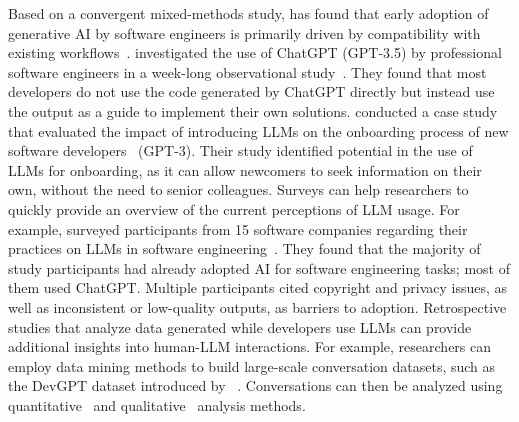 Based on a convergent mixed-methods study, \citeauthor{russo2024navigating} has found that early adoption of generative AI by software engineers is primarily driven by compatibility with existing workflows~\cite{russo2024navigating}.
\citeauthor{DBLP:journals/pacmse/KhojahM0N24} investigated the use of ChatGPT (GPT-3.5) by professional software engineers in a week-long observational study~\cite{DBLP:journals/pacmse/KhojahM0N24}.
They found that most developers do not use the code generated by ChatGPT directly but instead use the output as a guide to implement their own solutions.
\citeauthor{DBLP:conf/csee/AzanzaPIG24} conducted a case study that evaluated the impact of introducing LLMs on the onboarding process of new software developers~\cite{DBLP:conf/csee/AzanzaPIG24} (GPT-3).
Their study identified potential in the use of LLMs for onboarding, as it can allow newcomers to seek information on their own, without the need to  senior colleagues.
Surveys can help researchers to quickly provide an overview of the current perceptions of LLM usage.
For example, \citeauthor{DBLP:conf/icsa/JahicS24} surveyed participants from 15 software companies regarding their practices on LLMs in software engineering~\cite{DBLP:conf/icsa/JahicS24}.
They found that the majority of study participants had already adopted AI for software engineering tasks; most of them used ChatGPT.
Multiple participants cited copyright and privacy issues, as well as inconsistent or low-quality outputs, as barriers to adoption.
Retrospective studies that analyze data generated while developers use LLMs can provide additional insights into human-LLM interactions.
For example, researchers can employ data mining methods to build large-scale conversation datasets, such as the DevGPT dataset introduced by \citeauthor{DBLP:conf/msr/XiaoTHM24}~\cite{DBLP:conf/msr/XiaoTHM24}.
Conversations can then be analyzed using quantitative~\cite{DBLP:conf/msr/RabbiCZI24} and qualitative~\cite{DBLP:conf/msr/MohamedPP24} analysis methods.


